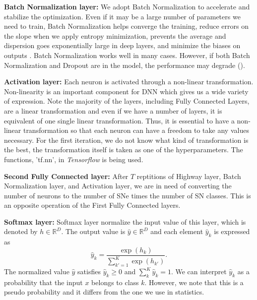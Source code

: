 \documentclass[proof]{pasj01}
\begin{document}
{\bf Batch Normalization layer:}
We adopt Batch Normalization \citep{batch_norm} to accelerate and stabilize the optimization. Even if it may be a large number of parameters we need to train, Batch Normalization helps converge the training, reduce errors on the slope when we apply entropy minimization, prevents the average and dispersion goes exponentially large in deep layers, and minimize the biases on outputs \citep{understanding_batch_norm}.
Batch Normalization works well in many cases. However, if both Batch Normalization and Dropout are in the model, the performance may degrade (\cite{dropout_and_batch_norm}).   

{\bf Activation layer:}
Each neuron is activated through a non-linear transformation.  Non-linearity is an important component for DNN which gives us a wide variety of expression.   Note the majority of the layers, including Fully Connected Layers, are a linear transformation and even if we have a number of layers, it is equivalent of one single linear transformation.   Thus, it is essential to have a non-linear transformation so that each neuron can have a freedom to take any values necessary.
For the first iteration, we do not know what kind of transformation is the best, the transformation itself is taken as one of the hyperparameters.  The functions, 'tf.nn', in {\it Tensorflow} is being used.

{\bf Second Fully Connected layer:}
After $T$ reptitions of Highway layer, Batch Normalization layer, and Activation layer,
we are in need of converting the number of neurons to the number of SNe times the number of SN classes.   This is an opposite operation of the First Fully Connected layers.

{\bf Softmax layer:}
Softmax layer normalize the input value of this layer, which is denoted by $h \in \mathbb{R}^D$. The output value is $\hat{y} \in \mathbb{R}^D$ and each element $\hat{y}_k$ is expressed as
\begin{equation}
    \hat{y}_k = \frac{\exp \left( h_k \right)}{\sum_{k'=1}^K \exp \left( h_{k'} \right)}.
\end{equation}
The normalized value $\hat{y}$ satisfies $\hat{y}_k \geq 0$ and $\sum_k^K \hat{y}_k =1$.
We can interpret $\hat{y}_k$ as a probability that the input $x$ belongs to class $k$.
However, we note that this is a pseudo probability and it differs from the one we use in statistics.
  
\end{document}
